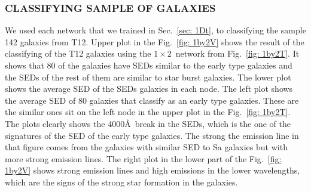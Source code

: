         \subsubsection{ CLASSIFYING SAMPLE OF GALAXIES}
         \label{sec: 1Dv}
            We used each network that we trained in Sec.~\ref{sec: 1Dt}, to classifying the sample 142 galaxies from T12.
            Upper plot in the Fig.~\ref{fig: 1by2V} shows the result of the classifying of the T12 galaxies using the $1 \times 2$~network from Fig.~\ref{fig: 1by2T}.
            It shows that 80 of the galaxies have SEDs similar to the early type galaxies and the SEDs of the rest of them are similar to star burst galaxies.
            The lower plot shows the average SED of the SEDs galaxies in each node. 
            The left plot shows the average SED of 80 galaxies that classify as an early type galaxies. 
            These are the similar ones sit on the left node in the upper plot in the Fig.~\ref{fig: 1by2T}.
            The plots clearly shows the 4000\AA~break in the SEDs, which is the one of the signatures of the SED of the early type galaxies.
            The strong the emission line in that figure comes from the galaxies with similar SED to Sa galaxies but with more strong emission lines.
            The right plot in the lower part of the Fig.~\ref{fig: 1by2V} shows strong emission lines and high emissions in the lower wavelengths, which are the signs of the strong star formation in the galaxies. 
